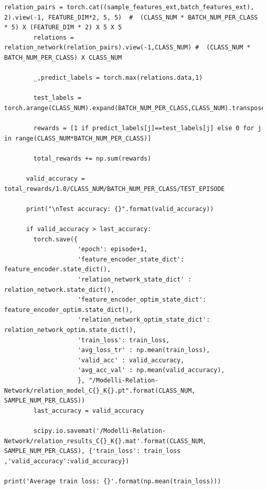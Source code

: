 \documentclass[12pt,a4paper,titlepage]{article}
\begin{document}
\begin{lstlisting}[language=iPython,firstnumber=1, caption=relation\_training.py, label=relation training,captionpos=b]
        relation_pairs = torch.cat((sample_features_ext,batch_features_ext), 2).view(-1, FEATURE_DIM*2, 5, 5)  #  (CLASS_NUM * BATCH_NUM_PER_CLASS * 5) X (FEATURE_DIM * 2) X 5 X 5
        relations = relation_network(relation_pairs).view(-1,CLASS_NUM) #  (CLASS_NUM * BATCH_NUM_PER_CLASS) X CLASS_NUM

        _,predict_labels = torch.max(relations.data,1)

        test_labels = torch.arange(CLASS_NUM).expand(BATCH_NUM_PER_CLASS,CLASS_NUM).transpose(1,0).reshape(-1)

        rewards = [1 if predict_labels[j]==test_labels[j] else 0 for j in range(CLASS_NUM*BATCH_NUM_PER_CLASS)]

        total_rewards += np.sum(rewards)

      valid_accuracy = total_rewards/1.0/CLASS_NUM/BATCH_NUM_PER_CLASS/TEST_EPISODE

      print("\nTest accuracy: {}".format(valid_accuracy))

      if valid_accuracy > last_accuracy:
        torch.save({
                    'epoch': episode+1,
                    'feature_encoder_state_dict': feature_encoder.state_dict(),
                    'relation_network_state_dict' : relation_network.state_dict(),
                    'feature_encoder_optim_state_dict': feature_encoder_optim.state_dict(),
                    'relation_network_optim_state_dict': relation_network_optim.state_dict(),
                    'train_loss': train_loss,
                    'avg_loss_tr' : np.mean(train_loss),
                    'valid_acc' : valid_accuracy,
                    'avg_acc_val' : np.mean(valid_accuracy),
                    }, "/Modelli-Relation-Network/relation_model_C{}_K{}.pt".format(CLASS_NUM, SAMPLE_NUM_PER_CLASS))
        last_accuracy = valid_accuracy

        scipy.io.savemat('/Modelli-Relation-Network/relation_results_C{}_K{}.mat'.format(CLASS_NUM, SAMPLE_NUM_PER_CLASS), {'train_loss': train_loss ,'valid_accuracy':valid_accuracy})

print('Average train loss: {}'.format(np.mean(train_loss)))
\end{lstlisting}
\end{document}
